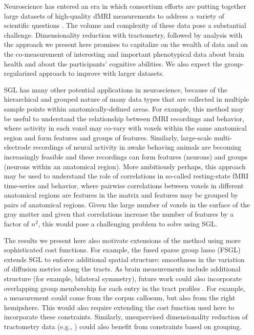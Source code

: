 Neuroscience has entered an era in which consortium efforts are putting together
large datasets of high-quality dMRI measurements to address a variety of
scientific questions \cite{jernigan2016ping, jernigan2018abcd,
alexander2017open, Miller2016-hw, VanEssen2012}. The volume and complexity of
these data pose a substantial challenge. Dimensionality reduction with
tractometry, followed by analysis with the approach we present here promises to
capitalize on the wealth of data and on the co-measurement of interesting and
important phenotypical data about brain health and about the participants'
cognitive abilities. We also expect the group-regularized approach to improve
with larger datasets.

SGL has many other potential applications in neuroscience, because
of the hierarchical and grouped nature of many data types that are
collected in multiple sample points within anatomically-defined areas.
For example, this method may be useful to understand the relationship
between fMRI recordings and behavior, where activity in each voxel
may co-vary with voxels within the same anatomical region and form
features and groups of features. Similarly, large-scale multi-electrode
recordings of neural activity in awake behaving animals are becoming
increasingly feasible \cite{steinmetz2018distributed, Jun2017-gv} and
these recordings can form features (neurons) and groups (neurons within
an anatomical region). More ambitiously perhaps, this approach may be
used to understand the role of correlations in so-called resting-state
fMRI time-series and behavior, where pairwise correlations between
voxels in different anatomical regions are features in the matrix and
features may be grouped by pairs of anatomical regions. Given the large
number of voxels in the surface of the gray matter and given that
correlations increase the number of features by a factor of $n^2$, this
would pose a challenging problem to solve using SGL.

The results we present here also motivate extensions of the method using more
sophisticated cost functions. For example, the fused sparse group lasso (FSGL)
\cite{zhou2012} extends SGL to enforce additional spatial structure: smoothness
in the variation of diffusion metrics along the tracts. As brain measurements
include additional structure (for example, bilateral symmetry), future work
could also incorporate overlapping group membership for each entry in the tract
profiles \cite{Rao2014-xm}. For example, a measurement could come from the
corpus callosum, but also from the right hemipshere. This would also require
extending the cost function used here to incorporate these constraints.
Similarly, unsupervised dimensionality reduction of tractometry data (e.g.,
\cite{Chamberland2019-mu}) could also benefit from constraints based on
grouping.

